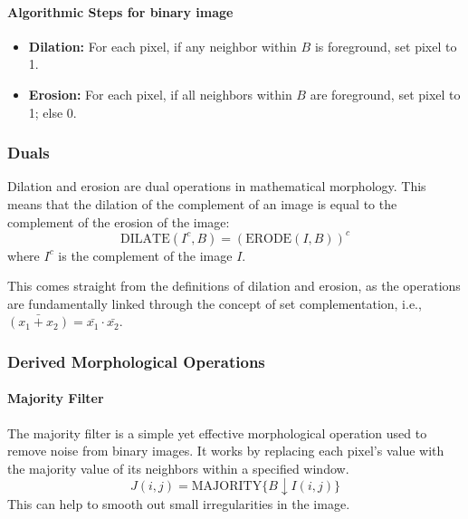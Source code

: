 
\paragraph{Algorithmic Steps for binary image}
\begin{itemize}
    \item \textbf{Dilation:} For each pixel, if any neighbor within $B$ is foreground, set pixel to 1.
    \item \textbf{Erosion:} For each pixel, if all neighbors within $B$ are foreground, set pixel to 1; else 0.
\end{itemize}


\subsubsection{Duals}
Dilation and erosion are dual operations in mathematical morphology. This means that the dilation of the complement of an image is equal to the complement of the erosion of the image:
$$
\text{DILATE}(I^c, B) = (\text{ERODE}(I, B))^c
$$
where $I^c$ is the complement of the image $I$.

This comes straight from the definitions of dilation and erosion, as the operations are fundamentally linked through the concept of set complementation, i.e., $\bar{(x_1 + x_2)} = \bar{x_1} \cdot \bar{x_2}$.

\subsubsection{Derived Morphological Operations}

\paragraph{Majority Filter}
The majority filter is a simple yet effective morphological operation used to remove noise from binary images. It works by replacing each pixel's value with the majority value of its neighbors within a specified window. 
\[
J(i,j) = \text{MAJORITY} \{ B \downarrow I(i,j) \}
\]
This can help to smooth out small irregularities in the image.

